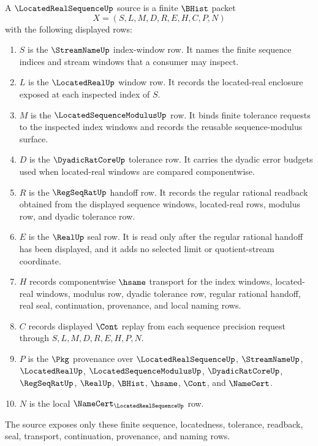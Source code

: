 \begin{definition}
\label{def:located-real-sequence-source}
A $\LocatedRealSequenceUp$ source is a finite $\BHist$ packet
$$
X=(S,L,M,D,R,E,H,C,P,N)
$$
with the following displayed rows:
\begin{enumerate}
\item $S$ is the $\StreamNameUp$ index-window row. It names the finite sequence indices and stream windows that a consumer may inspect.
\item $L$ is the $\LocatedRealUp$ window row. It records the located-real enclosure exposed at each inspected index of $S$.
\item $M$ is the $\LocatedSequenceModulusUp$ row. It binds finite tolerance requests to the inspected index windows and records the reusable sequence-modulus surface.
\item $D$ is the $\DyadicRatCoreUp$ tolerance row. It carries the dyadic error budgets used when located-real windows are compared componentwise.
\item $R$ is the $\RegSeqRatUp$ handoff row. It records the regular rational readback obtained from the displayed sequence windows, located-real rows, modulus row, and dyadic tolerance row.
\item $E$ is the $\RealUp$ seal row. It is read only after the regular rational handoff has been displayed, and it adds no selected limit or quotient-stream coordinate.
\item $H$ records componentwise $\hsame$ transport for the index windows, located-real windows, modulus row, dyadic tolerance row, regular rational handoff, real seal, continuation, provenance, and local naming rows.
\item $C$ records displayed $\Cont$ replay from each sequence precision request through $S,L,M,D,R,E,H,P,N$.
\item $P$ is the $\Pkg$ provenance over $\LocatedRealSequenceUp$, $\StreamNameUp$, $\LocatedRealUp$, $\LocatedSequenceModulusUp$, $\DyadicRatCoreUp$, $\RegSeqRatUp$, $\RealUp$, $\BHist$, $\hsame$, $\Cont$, and $\NameCert$.
\item $N$ is the local $\NameCert_{\LocatedRealSequenceUp}$ row.
\end{enumerate}
The source exposes only these finite sequence, locatedness, tolerance, readback, seal, transport, continuation, provenance, and naming rows.
\end{definition}

